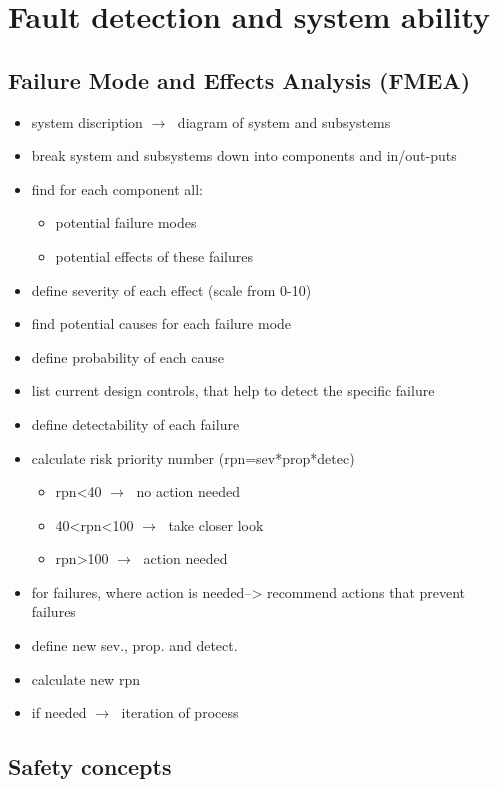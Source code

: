 \documentclass[ExampleMasters.tex]{subfiles}
\begin{document}
\clearpage


\chapter{Fault detection and system ability}
\label{chap:fault_detection}
\section{Failure Mode and Effects Analysis (FMEA)}
\label{sec:FMEA}
\begin{itemize}
	\item system discription $\rightarrow\;$ diagram of system and subsystems
	\item break system and subsystems down into components and in/out-puts
	\item find for each component all:
	\begin{itemize}
		\item potential failure modes
		\item potential effects of these failures
	\end{itemize}
	\item define severity of each effect (scale from 0-10)
	\item find potential causes for each failure mode
	\item define probability of each cause
	\item list current design controls, that help to detect the specific failure
	\item define detectability of each failure
	\item calculate risk priority number (rpn=sev*prop*detec)
	\begin{itemize}
		\item rpn<40 $\rightarrow\;$ no action needed
		\item 40<rpn<100 $\rightarrow\;$ take closer look
		\item rpn>100 $\rightarrow\;$ action needed
	\end{itemize}
	\item for failures, where action is needed--> recommend actions that prevent failures
	\item define new sev., prop. and detect.
	\item calculate new rpn
	\item if needed $\rightarrow\;$ iteration of process    
\end{itemize}
\section{Safety concepts}
\label{sec:safetyconcepts}
\end{document}
